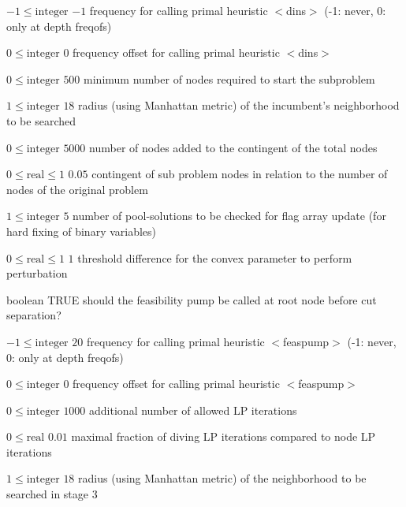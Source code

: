 %
{$-1\leq\textrm{integer}$}%
{$-1$}%
{frequency for calling primal heuristic $<$dins$>$ (-1: never, 0: only at depth freqofs)}%
{}

%
{$0\leq\textrm{integer}$}%
{$0$}%
{frequency offset for calling primal heuristic $<$dins$>$}%
{}

%
{$0\leq\textrm{integer}$}%
{$500$}%
{minimum number of nodes required to start the subproblem}%
{}

%
{$1\leq\textrm{integer}$}%
{$18$}%
{radius (using Manhattan metric) of the incumbent's neighborhood to be searched}%
{}

%
{$0\leq\textrm{integer}$}%
{$5000$}%
{number of nodes added to the contingent of the total nodes}%
{}

%
{$0\leq\textrm{real}\leq1$}%
{$0.05$}%
{contingent of sub problem nodes in relation to the number of nodes of the original problem}%
{}

%
{$1\leq\textrm{integer}$}%
{$5$}%
{number of pool-solutions to be checked for flag array update (for hard fixing of binary variables)}%
{}

%
{$0\leq\textrm{real}\leq1$}%
{$1$}%
{threshold difference for the convex parameter to perform perturbation}%
{}

%
{boolean}%
{TRUE}%
{should the feasibility pump be called at root node before cut separation?}%
{}

%
{$-1\leq\textrm{integer}$}%
{$20$}%
{frequency for calling primal heuristic $<$feaspump$>$ (-1: never, 0: only at depth freqofs)}%
{}

%
{$0\leq\textrm{integer}$}%
{$0$}%
{frequency offset for calling primal heuristic $<$feaspump$>$}%
{}

%
{$0\leq\textrm{integer}$}%
{$1000$}%
{additional number of allowed LP iterations}%
{}

%
{$0\leq\textrm{real}$}%
{$0.01$}%
{maximal fraction of diving LP iterations compared to node LP iterations}%
{}

%
{$1\leq\textrm{integer}$}%
{$18$}%
{radius (using Manhattan metric) of the neighborhood to be searched in stage 3}%
{}

